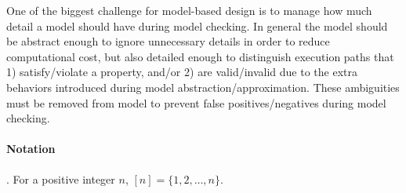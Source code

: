 One of the biggest challenge for model-based design is to manage how much detail a model should have during model checking. In general the model should be abstract enough to ignore unnecessary details in order to reduce computational cost, but also detailed enough to distinguish execution paths that 1) satisfy/violate a property, and/or 2) are valid/invalid due to the extra behaviors introduced during model abstraction/approximation. These ambiguities must be removed from model to prevent false positives/negatives during model checking. 




\paragraph{Notation}. For a positive integer $n$, $[n] = \{1,2,\ldots,n\}$.

%
%